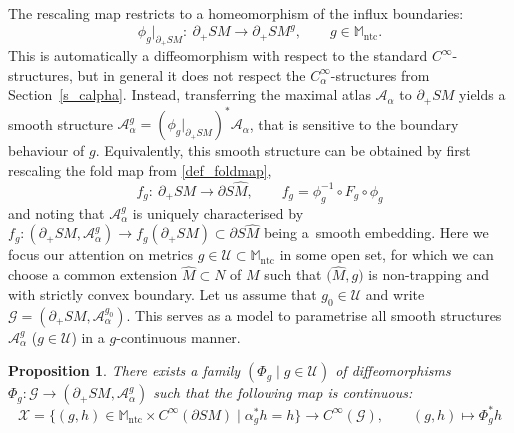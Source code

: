 \documentclass[pdftex]{sigma}
\numberwithin{equation}{section}
\newtheorem{Proposition}[Theorem]{Proposition}
\theoremstyle{definition}
\newcommand{\M}{\mathbb{M}}
\newcommand{\1}{{\bf 1}}
\newcommand{\ntc}{\mathrm{ntc}}
\begin{document}
The rescaling map restricts to a homeomorphism of the influx boundaries:
\[
		\phi_g|_{\partial_+SM}\colon\ \partial_+{SM} \to \partial_+SM^g,\qquad g\in \M_\ntc.
\]
This is automatically a diffeomorphism with respect to the standard $C^\infty$-structures, but in general it does not respect the $C_\alpha^\infty$-structures from Section~\ref{s_calpha}. Instead, transferring the maximal atlas $\mathcal A_\alpha$ to $\partial_+SM$ yields a smooth structure
$\mathcal A_{\alpha}^g = (\phi_g|_{\partial_+SM})^*\mathcal A_\alpha$,
that is sensitive to the boundary behaviour of $g$. Equivalently, this smooth structure can be obtained by first rescaling the fold map from \eqref{def_foldmap},
\[
	f_g\colon\ \partial_+SM \to \partial S\hat M,\qquad f_g = \phi_g^{-1}\circ F_g\circ \phi_g
\]
and noting that $\mathcal A_\alpha^g$ is uniquely characterised by $f_g\colon (\partial_+SM,\mathcal A_\alpha^g)\to f_g(\partial_+SM)\subset\partial S\hat M$ being a~smooth embedding. Here we focus our attention on metrics $g\in \mathcal U\subset \M_\ntc$ in some open set, for which we can choose a common extension $\hat M\subset N$ of $M$ such that $\bigl(\hat M,g\bigr)$ is non-trapping and with strictly convex boundary. Let us assume that $g_0\in \mathcal U$ and write
$\mathcal G = (\partial_+SM,\mathcal A_\alpha^{g_0})$.
This serves as a model to parametrise all smooth structures $\mathcal A_\alpha^g$ ($g\in \mathcal U$) in a $g$-continuous manner.

\begin{Proposition}\label{prop_refG}
	There exists a family $(\Phi_g\mid g\in \mathcal U)$ of diffeomorphisms $\Phi_g\colon \mathcal G\to (\partial_+SM,\mathcal A_\alpha^g)$ such that the following map is continuous:
	\[
		\mathcal X =\{(g,h)\in \M_\ntc\times C^\infty(\partial SM)\mid \alpha_g^*h=h\} \to C^\infty(\mathcal G),\qquad (g,h)\mapsto \Phi_g^* h
	\]
\end{Proposition}
\end{document}
